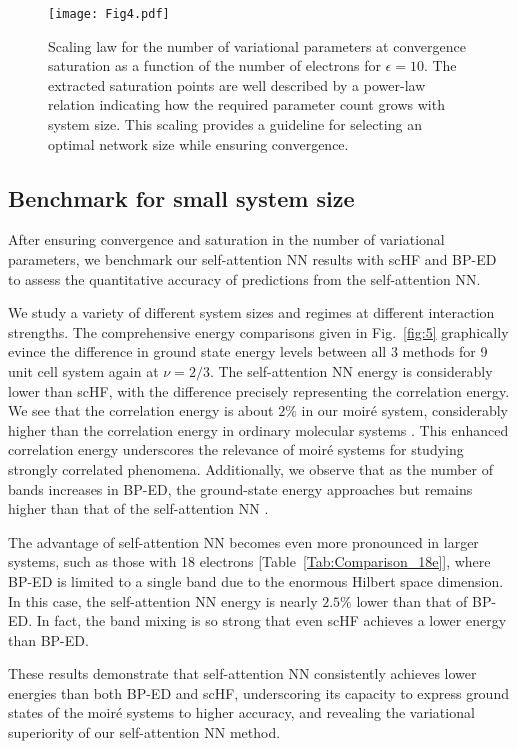 \documentclass[
 reprint,
 amsmath,amssymb,
 aps, prx,
floatfix,longbibliography,
]{revtex4-2}
\newcommand{\FNN}{self-attention NN }
\begin{document}
\begin{figure}
    \centering
    \texttt{[image: Fig4.pdf]}
    \caption{Scaling law for the number of variational parameters at convergence saturation as a function of the number of electrons for $\epsilon = 10$. The extracted saturation points are well described by a power-law relation indicating how the required parameter count grows with system size. This scaling provides a guideline for selecting an optimal network size while ensuring convergence. }
    \label{fig:4}
\end{figure}



\subsection{Benchmark for small system size}

After ensuring convergence and saturation in the number of variational parameters, we benchmark our \FNN results with scHF and BP-ED to assess the quantitative accuracy of predictions from the self-attention NN. 

We study a variety of different system sizes and regimes at different interaction strengths. The comprehensive energy comparisons given in Fig.~\ref{fig:5} graphically evince the difference in ground state energy levels between all 3 methods for 9 unit cell system again at $\nu=2/3$. The \FNN energy is considerably lower than scHF, with the difference precisely representing the correlation energy. We see that the correlation energy is about $2\%$ in our moiré system, considerably higher than the correlation energy in ordinary molecular systems \cite{Foulkes2001Jan}. 
This enhanced correlation energy underscores the relevance of moiré systems for studying strongly correlated phenomena. Additionally, we observe that as the number of bands increases in BP-ED, the ground-state energy approaches but remains higher than that of the \FNN.

The advantage of \FNN becomes even more pronounced in larger systems, such as those with 18 electrons [Table~\ref{Tab:Comparison_18e}], where BP-ED is limited to a single band due to the enormous Hilbert space dimension. In this case, the \FNN energy is nearly $2.5\%$ lower than that of BP-ED. In fact, the band mixing is so strong that even scHF achieves a lower energy than BP-ED.

These results demonstrate that \FNN consistently achieves lower energies than both BP-ED and scHF, underscoring its capacity to express ground states of the moir\'e systems to higher accuracy, and revealing the variational superiority of our \FNN method.
\end{document}
